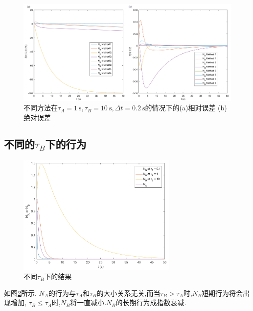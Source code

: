 \documentclass[UTF-8]{article}
\begin{document}
\begin{figure}[h]
	\centering
	\includegraphics[width=\textwidth]{Q_3_2_3.png}
	\caption{不同方法在$\tau_{A}=\SI{1}{\second}, \tau_{B}=\SI{10}{\second}, \Delta t=\SI{0.2}{\second}$的情况下的(a)相对误差 (b)绝对误差}
	\label{fig:Q-3-2-3}
\end{figure}

\subsection{不同的$\tau_{B}$下的行为}
\begin{figure}[h]
	\centering
	\includegraphics[width=0.7\textwidth]{Q_3_4.png}
	\caption{不同$\tau_{B}$下的结果}
	\label{fig:Q-3-4}
\end{figure}
如图\ref{fig:Q-3-4}所示, $N_A$的行为与$\tau_A$和$\tau_{B}$的大小关系无关,而当$\tau_{B}>\tau_{A}$时,$N_B$短期行为将会出现增加, $\tau_{B}\leqslant\tau_{A}$时,$N_B$将一直减小.$N_B$的长期行为成指数衰减.
\end{document}
